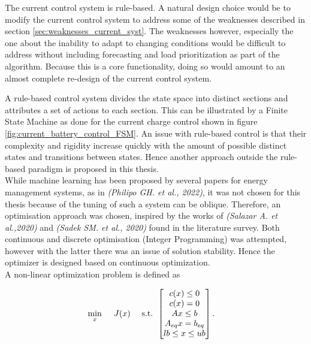 The current control system is rule-based. A natural design choice would be to modify the current control system to address some of the weaknesses described in section \ref{sec:weaknesses_current_syst}. The weaknesses however, especially the one about the inability to adapt to changing conditions would be difficult to address without including forecasting and load prioritization as part of the algorithm. Because this is a core functionality, doing so would amount to an almost complete re-design of the current control system. 

A rule-based control system divides the state space into distinct sections and attributes a set of actions to each section. This can be illustrated by a Finite State Machine as done for the current charge control shown in figure \ref{fig:current_battery_control_FSM}. An issue with rule-based control is that their complexity and rigidity increase quickly with the amount of possible distinct states and transitions between states.\cite{Casini2022-bs} Hence another approach outside the rule-based paradigm is proposed in this thesis.\\

While machine learning has been proposed by several papers for energy management systems, as in \textit{(Philipo GH. et al., 2022)},\cite{Philipo2022-rx} it was not chosen for this thesis because of the tuning of such a system can be oblique. Therefore, an optimisation approach was chosen, inspired by the works of \textit{(Salazar A. et al.,2020)} and \textit{(Sadek SM. et al., 2020)} found in the literature survey. Both continuous and discrete optimisation (Integer Programming) was attempted, however with the latter there was an issue of solution stability. Hence the optimizer is designed based on continuous optimization. \\

A non-linear optimization problem is defined as

\begin{align}
    \min_x\hspace{0.5cm} & J(x) &\text{   s.t.   } & \begin{bmatrix}
                                             c(x) \leq 0\\
                                             c(x) = 0\\
                                             Ax \leq b\\
                                             A_{eq}x = b_{eq}\\
                                             lb \leq x \leq ub
                                            \end{bmatrix}.
\end{align}

